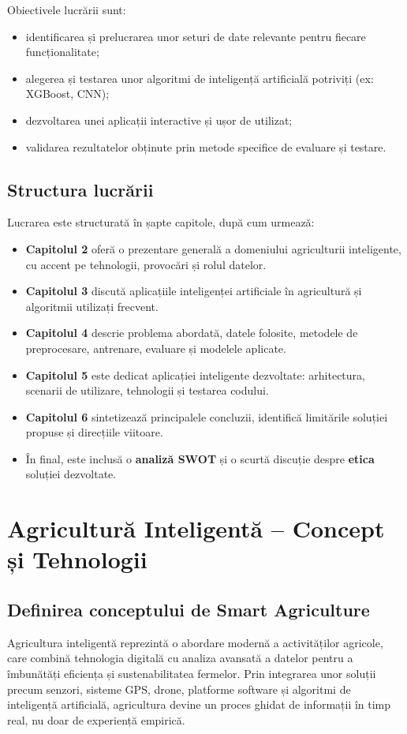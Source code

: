 \documentclass[runningheads,a4paper,11pt,twoside]{report}
\begin{document}
Obiectivele lucrării sunt:
\begin{itemize}
  \item identificarea și prelucrarea unor seturi de date relevante pentru fiecare funcționalitate;
  \item alegerea și testarea unor algoritmi de inteligență artificială potriviți (ex: XGBoost, CNN);
  \item dezvoltarea unei aplicații interactive și ușor de utilizat;
  \item validarea rezultatelor obținute prin metode specifice de evaluare și testare.
\end{itemize}

\section{Structura lucrării}
Lucrarea este structurată în șapte capitole, după cum urmează:

\begin{itemize}
  \item \textbf{Capitolul 2} oferă o prezentare generală a domeniului agriculturii inteligente, cu accent pe tehnologii, provocări și rolul datelor.
  \item \textbf{Capitolul 3} discută aplicațiile inteligenței artificiale în agricultură și algoritmii utilizați frecvent.
  \item \textbf{Capitolul 4} descrie problema abordată, datele folosite, metodele de preprocesare, antrenare, evaluare și modelele aplicate.
  \item \textbf{Capitolul 5} este dedicat aplicației inteligente dezvoltate: arhitectura, scenarii de utilizare, tehnologii și testarea codului.
  \item \textbf{Capitolul 6} sintetizează principalele concluzii, identifică limitările soluției propuse și direcțiile viitoare.
  \item În final, este inclusă o \textbf{analiză SWOT} și o scurtă discuție despre \textbf{etica} soluției dezvoltate.
\end{itemize}

\chapter{Agricultură Inteligentă – Concept și Tehnologii}

\section{Definirea conceptului de Smart Agriculture}
Agricultura inteligentă reprezintă o abordare modernă a activităților agricole, care combină tehnologia digitală cu analiza avansată a datelor pentru a îmbunătăți eficiența și sustenabilitatea fermelor. Prin integrarea unor soluții precum senzori, sisteme GPS, drone, platforme software și algoritmi de inteligență artificială, agricultura devine un proces ghidat de informații în timp real, nu doar de experiență empirică.
\end{document}
